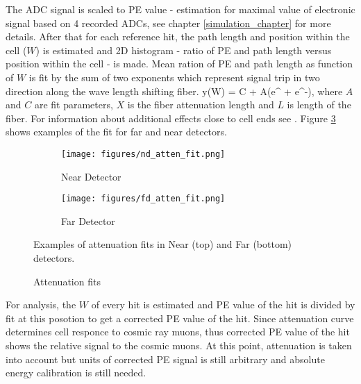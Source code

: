 The ADC signal is scaled to PE value - estimation for maximal value of electronic signal based on 4 recorded 
ADCs, see chapter \ref{simulation_chapter} for more details. After that for each reference hit, the path length 
and position within the cell ($W$) is estimated and 2D histogram - ratio of PE and path length versus position 
within the cell - is made. Mean ration of PE and path length as function of $W$ is fit by the sum of two exponents
which represent signal trip in two direction along the wave length shifting fiber.
\be
y(W) = C + A\Big(e^{} + e^{-}\Big),
\ee
where $A$ and $C$ are fit parameters, $X$ is the fiber attenuation length and $L$ is length of the fiber. For
information about additional effects close to cell ends see \cite{calib_technote}. Figure \ref{fig:att_fit} shows 
examples of the fit for far and near detectors.
\begin{figure}[t!]
\begin{subfigure}[t]{0.9\textwidth}
  \centering
  \texttt{[image: figures/nd\_atten\_fit.png]}
  \caption{Near Detector}
  \label{fig:att_fit_nd}
\end{subfigure}
\vspace{0.5cm}
\newline
\begin{subfigure}[t]{0.9\textwidth}
  \centering
  \texttt{[image: figures/fd\_atten\_fit.png]}
  \caption{Far Detector}
  \label{fig:att_fitt_fd}
\end{subfigure}
\caption{Attenuation fits}
{Examples of attenuation fits in Near (top) and Far (bottom) detectors.}
\label{fig:att_fit}
\end{figure}

For analysis, the $W$ of every hit is estimated and PE value of the hit is divided by fit at this posotion to 
get a corrected PE value of the hit. Since attenuation curve determines cell responce to cosmic ray muons, thus 
corrected PE value of the hit shows the relative signal to the cosmic muons. At this point, attenuation is taken
into account but units of corrected PE signal is still arbitrary and absolute energy calibration is still needed. 

